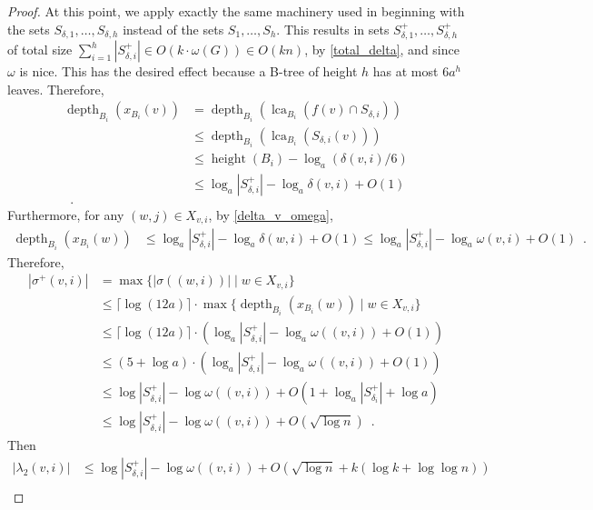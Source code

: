 \documentclass[twoside,leqno]{article}
\let\eqref\cref
\renewcommand{\le}{\leqslant}
\DeclareMathOperator{\height}{height}
\DeclareMathOperator{\depth}{depth}
\DeclareMathOperator{\lca}{lca}
\newcommand{\Oh}{O}
\begin{document}
\begin{proof}
    At this point, we apply exactly the same  machinery used in \cite{gawrychowski.janczewski:simpler,dujmovic.esperet.ea:adjacency} beginning with the sets $S_{\delta,1},\ldots,S_{\delta,h}$ instead of the sets $S_1,\ldots,S_h$.
    This results in sets $S^+_{\delta,1},\ldots,S^+_{\delta,h}$ of total size $\sum_{i=1}^h |S^+_{\delta,i}|\in \Oh(k\cdot\omega(G))\in \Oh(kn)$, by \eqref{total_delta}, and since $\omega$ is nice.
    This has the desired effect because a B-tree of height $h$ has at most $6a^h$ leaves.
    Therefore,
    \begin{align*}
      \depth_{B_i}(x_{B_i}(v))
       & =
      \depth_{B_i}(\lca_{B_i}(f(v)\cap S_{\delta,i}))            \\
       & \le
      \depth_{B_i}(\lca_{B_i}(S_{\delta,i}(v)))                  \\
       & \le\height(B_i)-\log_a(\delta(v,i)/6)                   \\
       & \le \log_a|S^+_{\delta,i}| - \log_a\delta(v,i) + \Oh(1) \\
      \enspace .
    \end{align*}
    Furthermore, for any $(w,j)\in X_{v,i}$, by \eqref{delta_v_omega},
    \begin{align*}
      \depth_{B_i}(x_{B_i}(w))
       & \le \log_a|S^+_{\delta,i}| - \log_a\delta(w,i) + \Oh(1)
      \le \log_a|S^+_{\delta,i}| - \log_a\omega(v,i) + \Oh(1) \enspace .
    \end{align*}
    Therefore,
    \begin{align*}
      |\sigma^+(v,i)|
       & = \max\{|\sigma((w,i))| \mid w\in X_{v,i}\}                                              \\
       & \le \lceil \log (12a)\rceil\cdot\max\{\depth_{B_i}(x_{B_i}(w)) \mid w\in X_{v,i}\}       \\
       & \le \lceil \log (12a)\rceil\cdot (\log_a|S^+_{\delta,i}| - \log_a\omega((v,i)) + \Oh(1)) \\
       & \le (5+ \log a)\cdot (\log_a|S^+_{\delta,i}| - \log_a\omega((v,i)) + \Oh(1))             \\
       & \le \log |S^+_{\delta,i}| - \log\omega((v,i)) + \Oh(1+\log_a |S^+_{\delta_i}| + \log a)  \\
       & \le \log |S^+_{\delta,i}| - \log\omega((v,i)) + \Oh(\sqrt{\log n}) \enspace .
    \end{align*}
    Then
    \begin{align*}
      |\lambda_2(v,i)|
       & \le \log |S^+_{\delta,i}|-\log \omega((v,i)) + \Oh(\sqrt{\log n} + k(\log k+\log\log n))            \\

\end{align*}
\end{proof}
\end{document}

